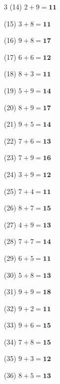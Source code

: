 \documentclass[a4paper, 11pt]{ltjsarticle}
\begin{document}
\begin{multicols*}{3}
\noindent (14) \quad $2 + 9 = \mathbf{11}$
\vspace*{\fill}

\noindent (15) \quad $3 + 8 = \mathbf{11}$
\vspace*{\fill}

\noindent (16) \quad $9 + 8 = \mathbf{17}$
\vspace*{\fill}

\noindent (17) \quad $6 + 6 = \mathbf{12}$
\vspace*{\fill}

\noindent (18) \quad $8 + 3 = \mathbf{11}$
\vspace*{\fill}

\noindent (19) \quad $5 + 9 = \mathbf{14}$
\vspace*{\fill}

\noindent (20) \quad $8 + 9 = \mathbf{17}$
\vspace*{\fill}

\noindent (21) \quad $9 + 5 = \mathbf{14}$
\vspace*{\fill}

\noindent (22) \quad $7 + 6 = \mathbf{13}$
\vspace*{\fill}

\noindent (23) \quad $7 + 9 = \mathbf{16}$
\vspace*{\fill}

\noindent (24) \quad $3 + 9 = \mathbf{12}$
\vspace*{\fill}
\columnbreak

\noindent (25) \quad $7 + 4 = \mathbf{11}$
\vspace*{\fill}

\noindent (26) \quad $8 + 7 = \mathbf{15}$
\vspace*{\fill}

\noindent (27) \quad $4 + 9 = \mathbf{13}$
\vspace*{\fill}

\noindent (28) \quad $7 + 7 = \mathbf{14}$
\vspace*{\fill}

\noindent (29) \quad $6 + 5 = \mathbf{11}$
\vspace*{\fill}

\noindent (30) \quad $5 + 8 = \mathbf{13}$
\vspace*{\fill}

\noindent (31) \quad $9 + 9 = \mathbf{18}$
\vspace*{\fill}

\noindent (32) \quad $9 + 2 = \mathbf{11}$
\vspace*{\fill}

\noindent (33) \quad $9 + 6 = \mathbf{15}$
\vspace*{\fill}

\noindent (34) \quad $7 + 8 = \mathbf{15}$
\vspace*{\fill}

\noindent (35) \quad $9 + 3 = \mathbf{12}$
\vspace*{\fill}

\noindent (36) \quad $8 + 5 = \mathbf{13}$
\vspace*{\fill}

\end{multicols*}
\end{document}
